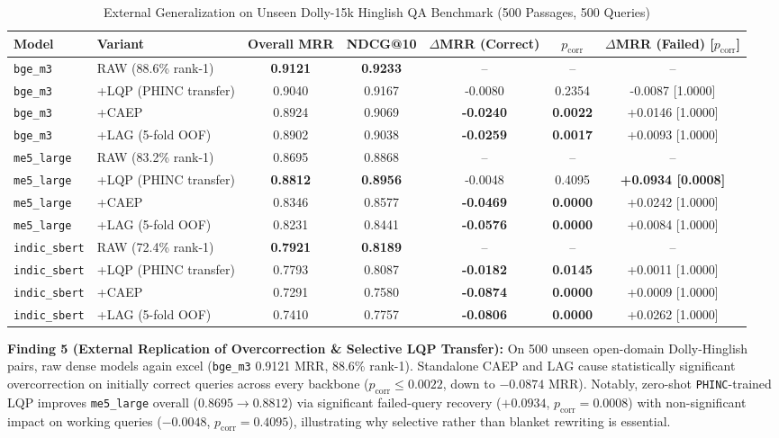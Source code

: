 \documentclass[conference]{IEEEtran}
\begin{document}
\begin{table}[t]
\caption{External Generalization on Unseen Dolly-15k Hinglish QA Benchmark (500 Passages, 500 Queries)}
\label{tab:dolly}
\centering
\begin{tabular}{llccccc}
\toprule
Model & Variant & Overall MRR & NDCG@10 & $\Delta$MRR (Correct) & $p_{\text{corr}}$ & $\Delta$MRR (Failed) [$p_{\text{corr}}$] \\
\midrule
\texttt{bge\_m3} & RAW (88.6\% rank-1) & \textbf{0.9121} & \textbf{0.9233} & -- & -- & -- \\
\texttt{bge\_m3} & +LQP (PHINC transfer) & 0.9040 & 0.9167 & -0.0080 & 0.2354 & -0.0087 [1.0000] \\
\texttt{bge\_m3} & +CAEP & 0.8924 & 0.9069 & \textbf{-0.0240} & \textbf{0.0022} & +0.0146 [1.0000] \\
\texttt{bge\_m3} & +LAG (5-fold OOF) & 0.8902 & 0.9038 & \textbf{-0.0259} & \textbf{0.0017} & +0.0093 [1.0000] \\
\midrule
\texttt{me5\_large} & RAW (83.2\% rank-1) & 0.8695 & 0.8868 & -- & -- & -- \\
\texttt{me5\_large} & +LQP (PHINC transfer) & \textbf{0.8812} & \textbf{0.8956} & -0.0048 & 0.4095 & \textbf{+0.0934 [0.0008]} \\
\texttt{me5\_large} & +CAEP & 0.8346 & 0.8577 & \textbf{-0.0469} & \textbf{0.0000} & +0.0242 [1.0000] \\
\texttt{me5\_large} & +LAG (5-fold OOF) & 0.8231 & 0.8441 & \textbf{-0.0576} & \textbf{0.0000} & +0.0084 [1.0000] \\
\midrule
\texttt{indic\_sbert} & RAW (72.4\% rank-1) & \textbf{0.7921} & \textbf{0.8189} & -- & -- & -- \\
\texttt{indic\_sbert} & +LQP (PHINC transfer) & 0.7793 & 0.8087 & \textbf{-0.0182} & \textbf{0.0145} & +0.0011 [1.0000] \\
\texttt{indic\_sbert} & +CAEP & 0.7291 & 0.7580 & \textbf{-0.0874} & \textbf{0.0000} & +0.0009 [1.0000] \\
\texttt{indic\_sbert} & +LAG (5-fold OOF) & 0.7410 & 0.7757 & \textbf{-0.0806} & \textbf{0.0000} & +0.0262 [1.0000] \\
\bottomrule
\end{tabular}
\end{table}

\textbf{Finding 5 (External Replication of Overcorrection \& Selective LQP Transfer):} On 500 unseen open-domain Dolly-Hinglish pairs, raw dense models again excel (\texttt{bge\_m3} 0.9121 MRR, 88.6\% rank-1). Standalone CAEP and LAG cause statistically significant overcorrection on initially correct queries across every backbone ($p_{\text{corr}} \le 0.0022$, down to $-0.0874$ MRR). Notably, zero-shot \texttt{PHINC}-trained LQP improves \texttt{me5\_large} overall ($0.8695 \to 0.8812$) via significant failed-query recovery ($+0.0934$, $p_{\text{corr}} = 0.0008$) with non-significant impact on working queries ($-0.0048$, $p_{\text{corr}} = 0.4095$), illustrating why selective rather than blanket rewriting is essential.
\end{document}
